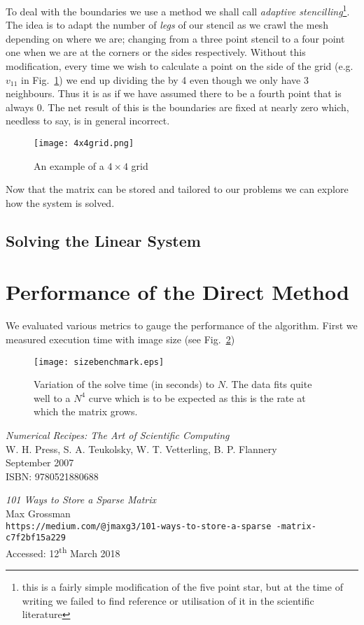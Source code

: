 \documentclass[a4paper]{article}
\begin{document}
To deal with the boundaries we use a method we shall call \emph{adaptive
stencilling}\footnote{this is a fairly simple modification of the five point
star, but at the time of writing we failed to find reference or utilisation of
it in the scientific literature}. The idea is to adapt the number of
\emph{legs} of our stencil as we crawl the mesh depending on where we are;
changing from a three point stencil to a four point one when we are at the
corners or the sides respectively. Without this modification, every time we
wish to calculate a point on the side of the grid (e.g. $v_{11}$ in
Fig.~\ref{gridFig}) we end up dividing the by 4 even though we only have 3
neighbours. Thus it is as if we have assumed there to be a fourth point that is
always 0. The net result of this is the boundaries are fixed at nearly zero
which, needless to say, is in general incorrect.
\begin{figure}
\centering
\texttt{[image: 4x4grid.png]}
\caption{An example of a $4 \times 4$ grid}
\label{gridFig}
\end{figure}

Now that the matrix can be stored and tailored to our problems we can explore
how the system is solved.

\subsection{Solving the Linear System}

\section{Performance of the Direct Method}
We evaluated various metrics to gauge the performance of the algorithm. First
we measured execution time with image size (see Fig.~\ref{sizetestFig})
\begin{figure}
	\centering
	\texttt{[image: sizebenchmark.eps]}
	\caption{Variation of the solve time (in seconds) to $N$. The data fits
	quite well to a $N^4$ curve which is to be expected as this is the rate
	at which the matrix grows.}
	\label{sizetestFig}
\end{figure}






\pagebreak
\begin{thebibliography}{9}

		\emph{Numerical Recipes: The Art of Scientific Computing}\\
		W. H. Press, S. A. Teukolsky, W. T. Vetterling, B. P. Flannery\\
		September 2007\\
		ISBN: 9780521880688

		\emph{101 Ways to Store a Sparse Matrix}\\
		Max Grossman\\
		\texttt{https://medium.com/@jmaxg3/101-ways-to-store-a-sparse
		-matrix-c7f2bf15a229}\\
		Accessed: 12\textsuperscript{th} March 2018

\end{thebibliography}
\end{document}
